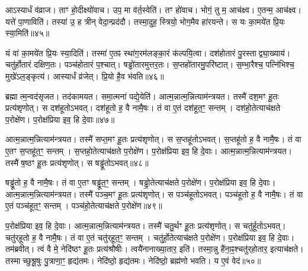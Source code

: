 आऽस्यार्धं व॑व्राज।
ताꣳ हो॒दीक्ष्यो॑वाच।
उप॒ मा व॑र्त॒स्वेति॑।
तꣳ हो॑वाच।
भोगं॒ तु म॒ आच॑क्ष्व।
ए॒तन्म॒ आच॑क्ष्व।
यत्ते॑ पा॒णाविति॑।
तस्या॑ उ॒ ह त्रीन् वेदा॒न्प्रद॑दौ।
तस्मा॒दुह॒ स्त्रियो॒ भोग॒मैव हा॑रयन्ते।
स यः का॒मये॑त प्रि॒यः स्या॒मिति॑॥४५॥

यं वा॑ का॒मये॑त प्रि॒यः स्या॒दिति॑।
तस्मा॑ ए॒तꣴ स्था॑ग॒रम॑लङ्का॒रं क॑ल्पयि॒त्वा।
दश॑होतारं पु॒रस्ताद्व्या॒ख्याय॑।
चतु॑र्\mbox{}होतारं दक्षिण॒तः।
पञ्च॑होतारं प॒श्चात्।
षड्ढो॑तारमुत्तर॒तः।
स॒प्तहो॑तारमु॒परि॑ष्टात्।
स॒म्भा॒रैश्च॒ पत्नि॑भिश्च॒ मुखे॑\-ऽल॒ङ्कृत्य॑।
आस्यार्धं व्र॑जेत्।
प्रि॒यो है॒व भ॑वति॥४६॥\anuvakamend[अ॒या॒न्य॒ल॒ङ्कृत्य॑ स्या॒मिति॑ भवति]

ब्रह्मात्म॒न्वद॑सृजत।
तद॑कामयत।
समा॒त्मना॑ पद्ये॒येति॑।
आत्म॒न्नात्म॒न्नित्याम॑न्त्रयत।
तस्मै॑ दश॒मꣳ हू॒तः प्रत्य॑शृणोत्।
स दश॑हूतो\-ऽभवत्।
दश॑हूतो ह॒ वै नामै॒षः।
तं वा ए॒तं दश॑हूत॒ꣳ॒ सन्तम्।
दश॑हो॒तेत्याच॑क्षते प॒रोक्षे॑ण।
प॒रोक्ष॑प्रिया इव॒ हि दे॒वाः॥४७॥

आत्म॒न्नात्म॒न्नित्याम॑न्त्रयत।
तस्मै॑ सप्त॒मꣳ हू॒तः प्रत्य॑शृणोत्।
स स॒प्तहू॑तो\-ऽभवत्।
स॒प्तहू॑तो ह॒ वै नामै॒षः।
तं वा ए॒तꣳ स॒प्तहू॑त॒ꣳ॒ सन्तम्।
स॒प्तहो॒तेत्याच॑क्षते प॒रोक्षे॑ण।
प॒रोक्ष॑प्रिया इव॒ हि दे॒वाः।
आत्म॒न्नात्म॒न्नित्याम॑न्त्रयत।
तस्मै॑ ष॒ष्ठꣳ हू॒तः प्रत्य॑शृणोत्।
स षड्ढू॑तो\-ऽभवत्॥४८॥

षड्ढू॑तो ह॒ वै नामै॒षः।
तं वा ए॒तꣳ षड्ढू॑त॒ꣳ॒ सन्तम्।
षड्ढो॒तेत्याच॑क्षते प॒रोक्षे॑ण।
प॒रोक्ष॑प्रिया इव॒ हि दे॒वाः।
आत्म॒न्नात्म॒न्नित्याम॑न्त्रयत।
तस्मै॑ पञ्च॒मꣳ हू॒तः प्रत्य॑शृणोत्।
स पञ्च॑हूतो\-ऽभवत्।
पञ्च॑हूतो ह॒ वै नामै॒षः।
तं वा ए॒तं पञ्च॑हूत॒ꣳ॒ सन्तम्।
पञ्च॑हो॒तेत्याच॑क्षते प॒रोक्षे॑ण॥४९॥

प॒रोक्ष॑प्रिया इव॒ हि दे॒वाः।
आत्म॒न्नात्म॒न्नित्याम॑न्त्रयत।
तस्मै॑ चतु॒र्थꣳ हू॒तः प्रत्य॑शृणोत्।
स चतु॑र्\mbox{}हूतो\-ऽभवत्।
चतु॑र्‌\mbox{}हूतो ह॒ वै नामै॒षः।
तं वा ए॒तं चतु॑र्‌\mbox{}हूत॒ꣳ॒ सन्तम्।
चतु॑र्\mbox{}हो॒तेत्याच॑क्षते प॒रोक्षे॑ण।
प॒रोक्ष॑प्रिया इव॒ हि दे॒वाः।
तम॑ब्रवीत्।
त्वं वै मे॒ नेदि॑ष्ठꣳ हू॒तः प्रत्य॑श्रौषीः।
त्वयै॑नानाख्या॒तार॒ इति॑।
तस्मा॒न्नु है॑ना॒ꣴ॒श्चतु॑र्‌\mbox{}होतार॒ इत्याच॑क्षते।
तस्माच्छुश्रू॒षुः पु॒त्राणा॒ꣳ॒ हृद्य॑तमः।
नेदि॑ष्ठो॒ हृद्य॑तमः।
नेदि॑ष्ठो॒ ब्रह्म॑णो भवति।
य ए॒वं वेद॑॥५०॥\anuvakamend[दे॒वाः षड्ढू॑तो\-ऽभव॒त्पञ्च॑हो॒तेत्याच॑क्षते प॒रोक्षे॑णाश्रौषीः॒ षट्च॑]




\clearpage
{}
\setcounter{anuvakam}{0}

